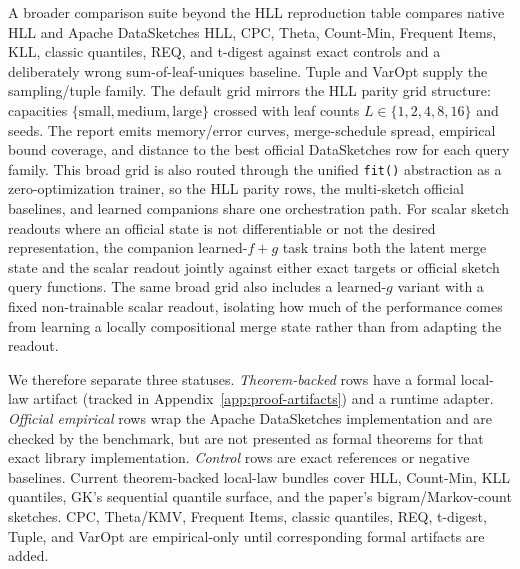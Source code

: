 A broader comparison suite beyond the HLL reproduction table compares
native HLL and Apache DataSketches HLL, CPC, Theta, Count-Min, Frequent
Items, KLL, classic quantiles, REQ, and t-digest against exact controls
and a deliberately wrong sum-of-leaf-uniques baseline. Tuple and VarOpt
supply the sampling/tuple family. The default grid mirrors the HLL
parity grid structure: capacities
\(\{\text{small},\text{medium},\text{large}\}\) crossed with leaf counts
\(L\in\{1,2,4,8,16\}\) and seeds. The report emits memory/error curves,
merge-schedule spread, empirical bound coverage, and distance to the
best official DataSketches row for each query family.
This broad grid is also routed through the unified
\texttt{fit()} abstraction as a zero-optimization trainer, so the HLL
parity rows, the multi-sketch official baselines, and learned companions
share one orchestration path. For scalar sketch readouts where an
official state is not differentiable or not the desired representation,
the companion learned-\(f{+}g\) task trains both the latent merge state
and the scalar readout jointly against either exact targets or official
sketch query functions. The same broad grid also includes a learned-\(g\)
variant with a fixed non-trainable scalar readout, isolating how much of
the performance comes from learning a locally compositional merge state
rather than from adapting the readout.

We therefore separate three statuses. \emph{Theorem-backed} rows have a
formal local-law artifact (tracked in Appendix~\ref{app:proof-artifacts})
and a runtime adapter. \emph{Official empirical} rows wrap the Apache
DataSketches implementation and are checked by the benchmark, but are
not presented as formal theorems for that exact library implementation.
\emph{Control} rows are exact references or negative baselines. Current
theorem-backed local-law bundles cover HLL, Count-Min, KLL quantiles,
GK's sequential quantile surface, and the paper's bigram/Markov-count
sketches. CPC, Theta/KMV, Frequent Items, classic quantiles, REQ,
t-digest, Tuple, and VarOpt are empirical-only until corresponding
formal artifacts are added.


